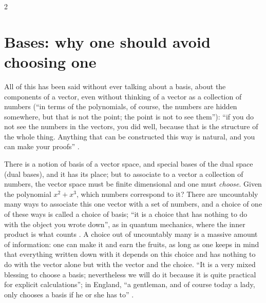\begin{paracol}{2}
\section{Bases: why one should avoid choosing one}\label{sec:c03-basis}

All of this has been said without ever talking about a basis, about the components of a vector, even without thinking of a vector as a collection of numbers (``in terms of the polynomials, of course, the numbers are hidden somewhere, but that is not the point; the point is not to see them''):
``if you do not see the numbers in the vectors, you did well, because that is the structure of the whole thing. Anything that can be constructed this way is natural, and you can make your proofs'' .

There is a notion of basis of a vector space, and special bases of the dual space (dual bases), and it has its place; but to associate to a vector a collection of numbers, the vector space must be finite dimensional and one must \emph{choose}. Given the polynomial $x^2+x^3$, which
numbers correspond to it? There are uncountably many ways to associate this one vector with a set of numbers, and a choice of one of these ways is called a choice of basis; ``it is a choice that has nothing to do with the object you wrote down'', as in quantum mechanics, where the inner product is what counts
. A choice out of uncountably many is a massive amount of information: one can make it and earn the fruits, as long as one keeps in mind that everything written down with it depends on this choice and has
nothing to do with the vector alone but with the vector and the choice. ``It is a very mixed blessing to choose a basis; nevertheless we will do it because it is quite practical for explicit calculations''; in England, ``a gentleman, and of course today a lady, only chooses a basis if he or she has to''
.


\end{paracol}
